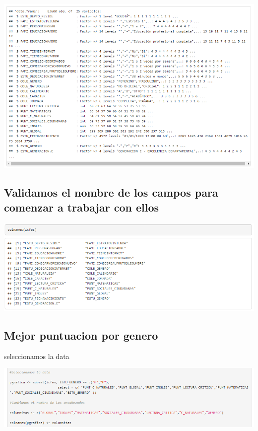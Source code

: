 \documentclass{article}
\begin{document}
\begin{center}
\includegraphics[scale=0.5]{Captura1.PNG} 
\end{center}


\begin{center}
\subsection{Validamos el nombre de los campos para comenzar a trabajar con ellos}


\includegraphics[scale=0.5]{Captura2.PNG} 
\end{center}
\newpage

\subsection{Mejor puntuacion por genero}

seleccionamos la data

\begin{center}
\includegraphics[scale=0.5]{Captura3.PNG} 
\end{center}
\end{document}
